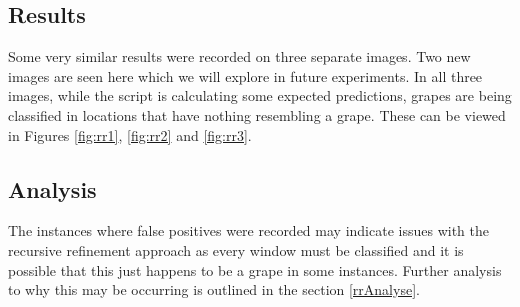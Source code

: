 \tocless\subsection{Results}
Some very similar results were recorded on three separate images. Two new images are seen
here which we will explore in future experiments. In all three images, while the script
is calculating some expected predictions, grapes are being classified in locations
that have nothing resembling a grape. These can be viewed in Figures
\ref{fig:rr1}, \ref{fig:rr2} and \ref{fig:rr3}.

\tocless\subsection{Analysis}
The instances where false positives were recorded may indicate issues with the recursive refinement approach as every window must be classified and it is possible that this just happens to be a grape in some instances.
Further analysis to why this may be occurring is outlined in the section \ref{rrAnalyse}.
